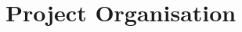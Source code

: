 \documentclass[11pt,a4paper]{article}
\begin{document}
\section{Project Organisation}















%
%
\end{document}
